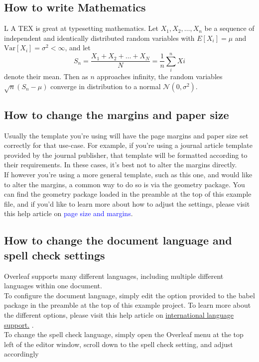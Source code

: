 \documentclass{article}
\begin{document}
\subsection{How to write Mathematics}
L A TEX is great at typesetting mathematics. Let $X_1 , X_2 , \ldots, X_n$ be a sequence of independent and 
identically distributed random variables with $E[X_i ] = \mu$ and $\text{Var}[X_i] = \sigma^2 < \infty$, and let
\[
S_n=\frac{X_1+X_2+\ldots+X_N}{N}=\frac{1}{n} \sum_{i}^{n} Xi
\]
denote their mean. Then as $n$ approaches infinity, the random variables
$\sqrt{n}(S_n-\mu)$ converge in distribution to a normal
$\mathcal{N}(0,\sigma^2 )$.

\subsection{How to change the margins and paper size}
Usually the template you’re using will have the page margins and paper size set correctly for that
use-case. For example, if you’re using a journal article template provided by the journal publisher,
that template will be formatted according to their requirements. In these cases, it’s best not to alter
the margins directly.
\\
If however you’re using a more general template, such as this one, and would like to alter the
margins, a common way to do so is via the geometry package. You can find the geometry package
loaded in the preamble at the top of this example file, and if you’d like to learn more about how to
adjust the settings, please visit this help article on \textcolor{blue}{page size and margins}.
\subsection{How to change the document language and spell check settings}
Overleaf supports many different languages, including multiple different languages within one document.
\\
To configure the document language, simply edit the option provided to the babel package in the
preamble at the top of this example project. To learn more about the different options, please visit
this help article on \href{https://www.overleaf.com/learn/latex/International_language_support}{international language support.} .\\
To change the spell check language, simply open the Overleaf menu at the top left of the editor
window, scroll down to the spell check setting, and adjust accordingly
\end{document}
